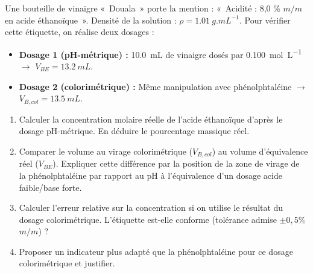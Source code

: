 \documentclass[11pt]{article}
\begin{document}
\begin{exercice}
Une bouteille de vinaigre «~Douala~» porte la mention : «~Acidité : 8,0 \% $m/m$ en acide éthanoïque~». Densité de la solution : $\rho = \SI{1,01}{g.mL^{-1}}$. Pour vérifier cette étiquette, on réalise deux dosages :
\begin{itemize}
    \item \textbf{Dosage 1 (pH-métrique) :} \SI{10,0}{mL} de vinaigre dosés par  \SI{0,100}{mol.L^{-1}} $\rightarrow$ $V_{BE} = \SI{13,2}{mL}$.
    \item \textbf{Dosage 2 (colorimétrique) :} Même manipulation avec phénolphtaléine $\rightarrow$ $V_{B,col} = \SI{13,5}{mL}$.
\end{itemize}
\begin{enumerate}
    \item Calculer la concentration molaire réelle de l'acide éthanoïque d'après le dosage pH-métrique. En déduire le pourcentage massique réel.
    \item Comparer le volume au virage colorimétrique ($V_{B,col}$) au volume d'équivalence réel ($V_{BE}$). Expliquer cette différence par la position de la zone de virage de la phénolphtaléine par rapport au pH à l'équivalence d'un dosage acide faible/base forte.
    \item Calculer l'erreur relative sur la concentration si on utilise le résultat du dosage colorimétrique. L'étiquette est-elle conforme (tolérance admise $\pm 0,5\%$ $m/m$) ?
    \item Proposer un indicateur plus adapté que la phénolphtaléine pour ce dosage colorimétrique et justifier.
\end{enumerate}
\end{exercice}
\end{document}
